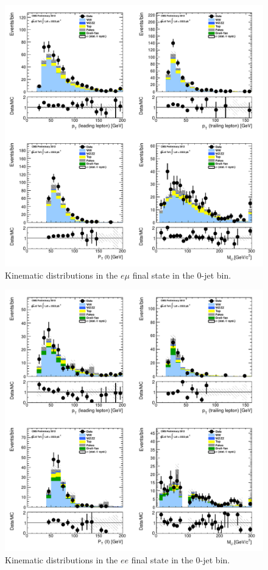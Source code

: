 \begin{figure}[!hbtp]
\centering
\includegraphics[width=1\textwidth]{figures/ww_analysis20_0_ALL_em_0j.pdf} %
\caption{Kinematic distributions in the $e\mu$ final state in the 0-jet bin.}
\label{fig:xs_kinematics_em_0j}
\end{figure}
\begin{figure}[!hbtp]
\centering
\includegraphics[width=1\textwidth]{figures/ww_analysis20_0_ALL_ee_0j.pdf} %
\caption{Kinematic distributions in the $ee$ final state in the 0-jet bin.}
\label{fig:xs_kinematics_ee_0j}
\end{figure}
